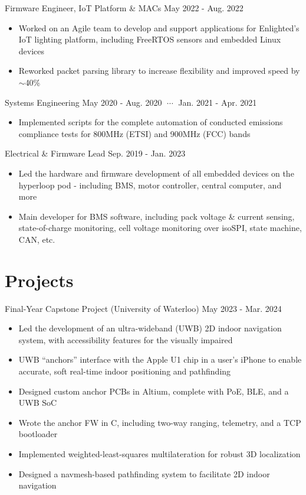 \documentclass[lighthipster]{styles}
\begin{document}
\begin{paracol}{2}
{Firmware Engineer, IoT Platform \& MACs}
{May 2022 - Aug. 2022}
\begin{itemize}
    \item Worked on an Agile team to develop and support applications for Enlighted's
          IoT lighting platform, including FreeRTOS sensors and embedded Linux devices
    \item Reworked packet parsing library to increase flexibility and improved speed by $\sim$40\%
\end{itemize}

{Systems Engineering}
{May 2020 - Aug. 2020 $\;\cdots\;$ Jan. 2021 - Apr. 2021}
\begin{itemize}
    \item Implemented scripts for the complete automation of conducted emissions
          compliance tests for 800MHz (ETSI) and 900MHz (FCC) bands
\end{itemize}

{Electrical \& Firmware Lead}
{Sep. 2019 - Jan. 2023}
\begin{itemize}
    \item Led the hardware and firmware development of all embedded devices on the hyperloop
          pod - including BMS, motor controller, central computer, and more
    \item Main developer for BMS software, including pack voltage \& current sensing,
          state-of-charge monitoring, cell voltage monitoring over isoSPI, state machine, CAN, etc.
\end{itemize}

\section*{Projects}

{Final-Year Capstone Project (University of Waterloo)}
{May 2023 - Mar. 2024}
\begin{itemize}
    \item Led the development of an ultra-wideband (UWB) 2D indoor navigation system,
          with accessibility features for the visually impaired
    \item UWB “anchors” interface with the Apple U1 chip in a user's iPhone to enable
          accurate, soft real-time indoor positioning and pathfinding
    \item Designed custom anchor PCBs in Altium, complete with PoE, BLE, and a UWB SoC
    \item Wrote the anchor FW in C, including two-way ranging, telemetry, and a TCP
          bootloader
    \item Implemented weighted-least-squares multilateration for robust 3D localization 
    \item Designed a navmesh-based pathfinding system to facilitate 2D indoor navigation
\end{itemize}



\end{paracol}
\end{document}
